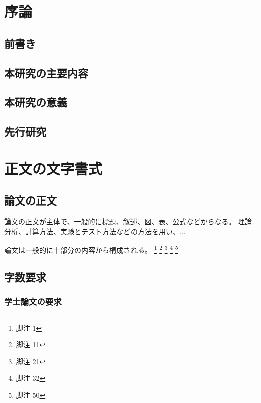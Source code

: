 \chapter{序論}

\section{前書き}


\section{本研究の主要内容}


\section{本研究の意義}


\section{先行研究}



\chapter{正文の文字書式}

\section{論文の正文}

論文の正文が主体で、一般的に標題、叙述、図、表、公式などからなる。
理論分析、計算方法、実験とテスト方法などの方法を用い、...

論文は一般的に十部分の内容から構成される。
\footnote[1]{脚注 1}
\footnote[11]{脚注 11}
\footnote[21]{脚注 21}
\footnote[32]{脚注 32}
\footnote[50]{脚注 50}

\section{字数要求}

\subsection{学士論文の要求}

